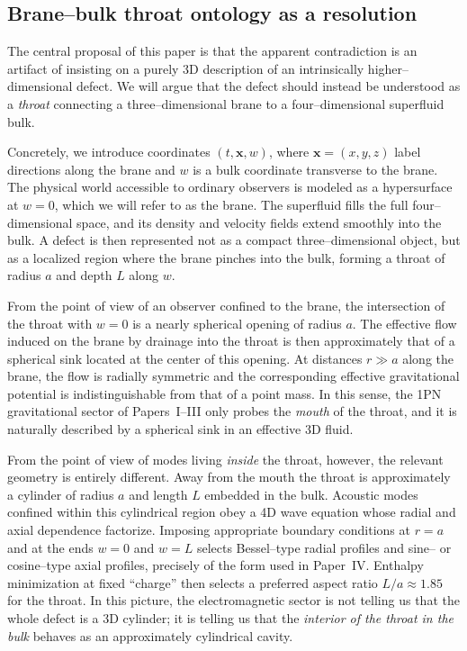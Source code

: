 \documentclass[12pt]{article}
\begin{document}
\subsection{Brane--bulk throat ontology as a resolution}
\label{subsec:intro_ontology}

The central proposal of this paper is that the apparent contradiction is an
artifact of insisting on a purely 3D description of an intrinsically
higher–dimensional defect.  We will argue that the defect should instead be
understood as a \emph{throat} connecting a three–dimensional brane to a
four–dimensional superfluid bulk.

Concretely, we introduce coordinates $(t,\mathbf{x},w)$, where
$\mathbf{x} = (x,y,z)$ label directions along the brane and $w$ is a bulk
coordinate transverse to the brane.  The physical world accessible to
ordinary observers is modeled as a hypersurface at $w=0$, which we will
refer to as the brane.  The superfluid fills the full four–dimensional
space, and its density and velocity fields extend smoothly into the bulk.
A defect is then represented not as a compact three–dimensional object,
but as a localized region where the brane pinches into the bulk, forming a
throat of radius $a$ and depth $L$ along $w$.

From the point of view of an observer confined to the brane, the intersection
of the throat with $w=0$ is a nearly spherical opening of radius $a$.  The
effective flow induced on the brane by drainage into the throat is then
approximately that of a spherical sink located at the center of this
opening.  At distances $r \gg a$ along the brane, the flow is radially
symmetric and the corresponding effective gravitational potential is
indistinguishable from that of a point mass.  In this sense, the 1PN
gravitational sector of Papers~I--III only probes the \emph{mouth} of the
throat, and it is naturally described by a spherical sink in an effective
3D fluid.

From the point of view of modes living \emph{inside} the throat, however,
the relevant geometry is entirely different.  Away from the mouth the
throat is approximately a cylinder of radius $a$ and length $L$ embedded in
the bulk.  Acoustic modes confined within this cylindrical region obey a
4D wave equation whose radial and axial dependence factorize.  Imposing
appropriate boundary conditions at $r=a$ and at the ends $w=0$ and $w=L$
selects Bessel–type radial profiles and sine– or cosine–type axial profiles,
precisely of the form used in Paper~IV.  Enthalpy minimization at fixed
``charge'' then selects a preferred aspect ratio $L/a \approx 1.85$ for the
throat.  In this picture, the electromagnetic sector is not telling us that
the whole defect is a 3D cylinder; it is telling us that the \emph{interior
of the throat in the bulk} behaves as an approximately cylindrical cavity.
\end{document}
